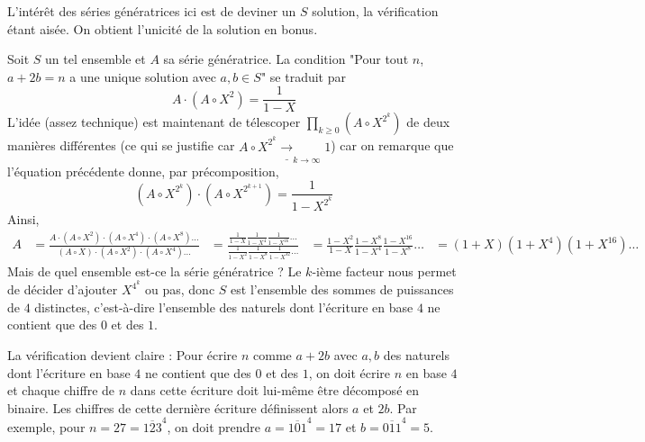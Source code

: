 \begin{sol}
L'intérêt des séries génératrices ici est de deviner un $S$ solution, la vérification étant aisée. On obtient l'unicité de la solution en bonus.

Soit $S$ un tel ensemble et $A$ sa série génératrice. La condition "Pour tout $n$, $a + 2b = n$ a une unique solution avec $a, b \in S$" se traduit par
$$A\cdot \left(A\circ X^2\right) = \frac 1{1 - X}$$
L'idée (assez technique) est maintenant de télescoper $\prod_{k \ge 0} (A\circ X^{2^k})$ de deux manières différentes (ce qui se justifie car $A\circ X^{2^k} \underline\rightarrow_{k \rightarrow \infty} 1$) car on remarque que l'équation précédente donne, par précomposition,
$$\left(A\circ X^{2^k}\right)\cdot \left(A\circ X^{2^{k + 1}}\right) = \frac 1{1 - X^{2^k}}$$
Ainsi,
\begin{align*}
A
& = \frac{A\cdot \left(A\circ X^2\right)\cdot \left(A\circ X^4\right)\cdot \left(A\circ X^8\right)\dots}{(A\circ X)\cdot \left(A\circ X^2\right)\cdot \left(A\circ X^4\right)\dots}
& = \frac{\frac 1{1 - X}\frac 1{1 - X^4}\frac 1{1 - X^{16}}\dots}{\frac 1{1 - X^2}\frac 1{1 - X^8}\frac 1{1 - X^{32}}\dots}
& = \frac {1 - X^2}{1 - X}\frac {1 - X^8}{1 - X^4}\frac {1 - X^{16}}{1 - X^8}\dots
& = (1 + X)(1 + X^4)(1 + X^{16})\dots
\end{align*}
Mais de quel ensemble est-ce la série génératrice ? Le $k$-ième facteur nous permet de décider d'ajouter $X^{4^k}$ ou pas, donc $S$ est l'ensemble des sommes de puissances de $4$ distinctes, c'est-à-dire l'ensemble des naturels dont l'écriture en base $4$ ne contient que des $0$ et des $1$.

La vérification devient claire : Pour écrire $n$ comme $a + 2b$ avec $a, b$ des naturels dont l'écriture en base $4$ ne contient que des $0$ et des $1$, on doit écrire $n$ en base $4$ et chaque chiffre de $n$ dans cette écriture doit lui-même être décomposé en binaire. Les chiffres de cette dernière écriture définissent alors $a$ et $2b$. Par exemple, pour $n = 27 = \overline{123}^4$, on doit prendre $a = \overline{101}^4 = 17 $ et $b = \overline{011}^4 = 5$.
\end{sol}


